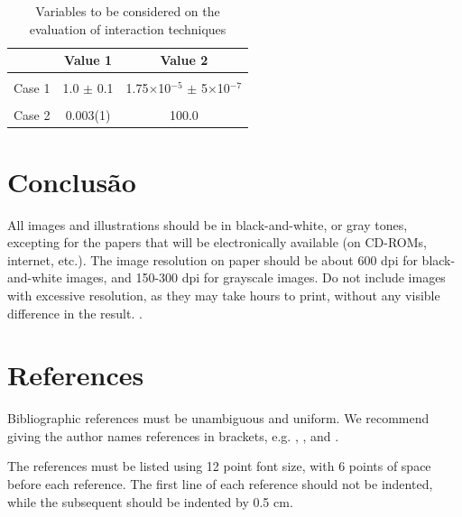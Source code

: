 \documentclass[12pt]{article}
\begin{document}
\begin{table}[ht]
\centering
\caption{Variables to be considered on the evaluation of interaction
  techniques}
\label{tab:exTable1}
\smallskip
\begin{tabular}{|l|c|c|}
\hline
& Value 1 & Value 2\\[0.5ex]
\hline
&&\\[-2ex]
Case 1 & 1.0 $\pm$ 0.1 & 1.75$\times$10$^{-5}$ $\pm$ 5$\times$10$^{-7}$\\[0.5ex]
\hline
&&\\[-2ex]
Case 2 & 0.003(1) & 100.0\\[0.5ex]
\hline
\end{tabular}
\end{table}

\section{Conclusão}

All images and illustrations should be in black-and-white, or gray tones,
excepting for the papers that will be electronically available (on CD-ROMs,
internet, etc.). The image resolution on paper should be about 600 dpi for
black-and-white images, and 150-300 dpi for grayscale images.  Do not include
images with excessive resolution, as they may take hours to print, without any
visible difference in the result. \cite{starner1997augmented}.

\section{References}

Bibliographic references must be unambiguous and uniform.  We recommend giving
the author names references in brackets, e.g. \cite{knuth:84},
\cite{boulic:91}, and \cite{smith:99}.

The references must be listed using 12 point font size, with 6 points of space
before each reference. The first line of each reference should not be
indented, while the subsequent should be indented by 0.5 cm.



\end{document}
